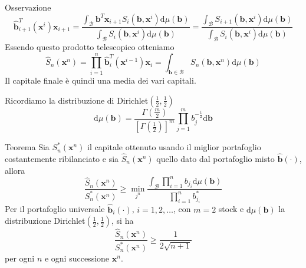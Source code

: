 \documentclass{beamer}
\theoremstyle{plain}
\theoremstyle{definition}
\theoremstyle{remark}
\newcommand{\x}{\bm{x}}
\newcommand{\B}{\bm{b}}
\newcommand{\bh}{\hat{\bm{b}}}
\newcommand{\Sh}{\hat{S}}
\newcommand{\dmu}{\text{d}\mu(\B)}
\begin{document}
\begin{frame}
	\begin{block}{Osservazione}
		\begin{equation*}
		\bh_{i+1}^T(\x^i)\x_{i+1} = \frac{\int_\mathcal{B}{\B^T\x_{i+1} S_i(\B,\x^i)\dmu}}{\int_\mathcal{B}{S_i(\B,\x^i)\dmu}}= \frac{\int_\mathcal{B}{S_{i+1}(\B,\x^i)\dmu}}{\int_\mathcal{B}{S_i(\B,\x^i)\dmu}}
		\end{equation*}
		Essendo questo prodotto telescopico otteniamo
		\begin{equation*}\label{capituniv}
		\Sh_n(\x^n) = \prod_{i = 1}^n{\bh^T_i(\x^{i-1})\x_i} = \int_{\B \in \mathcal{B}}{S_n(\B,\x^n)\dmu}
		\end{equation*}
		Il capitale finale è quindi una media dei vari capitali.
	\end{block}
	Ricordiamo la distribuzione di Dirichlet$\left(\frac{1}{2},\frac{1}{2}\right)$
	\begin{equation*}
	\dmu = \frac{\Gamma\left(\frac{m}{2}\right)}{\left[\Gamma\left(\frac{1}{2}\right)\right]^m}\prod_{j =1}^m{b_j^{-\frac{1}{2}}}\text{d}\B
	\end{equation*}
\end{frame}

\begin{frame}[label=UnivInf]
	\begin{block}{Teorema}
		Sia $S_n^*(\x^n)$ il capitale ottenuto usando il miglior portafoglio costantemente ribilanciato e sia $\Sh_n(\x^n)$ quello dato dal portafoglio misto $\bh(\cdot)$, allora
		\begin{equation*}
		\frac{\Sh_n(\x^n)}{S_n^*(\x^n)}\geq \min\limits_{j^n}\frac{\int_\mathcal{B}{\prod_{i = 1}^n{b_{j_i}\dmu}}}{\prod_{i = 1}^n{b^*_{j_i}}}
		\end{equation*}
		Per il portafoglio universale $\bh_i(\cdot)$, $i = 1,2,\ldots$, con $m = 2$ stock e $\dmu$ la distribuzione Dirichlet$\left(\frac{1}{2},\frac{1}{2}\right)$, si ha
		\begin{equation*}
		\frac{\Sh_n(\x^n)}{S_n^*(\x^n)}\geq \frac{1}{2\sqrt{n+1}}
		\end{equation*}
		per ogni $n$ e ogni successione $\x^n$.
	\end{block}
	\hyperlink{UnivInfdim}{}
\end{frame}
\end{document}
